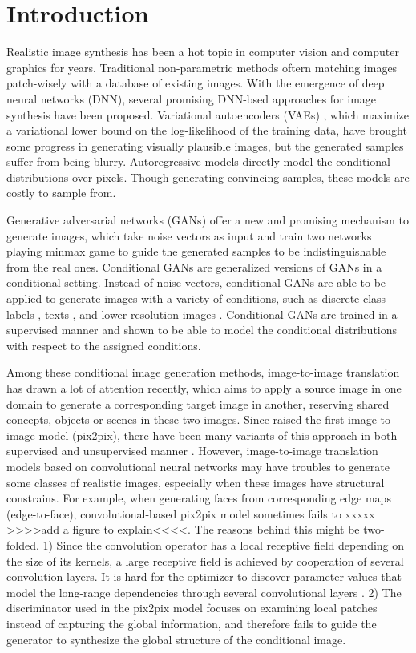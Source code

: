 \section{Introduction}
Realistic image synthesis has been a hot topic in computer vision and computer graphics for years. Traditional non-parametric methods \cite{see DCGAN paper} oftern matching images patch-wisely with a database of existing images. With the emergence of deep neural networks (DNN), several promising DNN-bsed approaches for image synthesis have been proposed. Variational autoencoders (VAEs) \cite{VAEs}, which maximize a variational lower bound on the log-likelihood of the training data, have brought some progress in generating visually plausible images, but the generated samples suffer from being blurry. Autoregressive models \cite{PixCNN} directly model the conditional distributions over pixels. Though generating convincing samples, these models are costly to sample from.
%

Generative adversarial networks (GANs) \cite{GANs} offer a new and promising mechanism to generate images, which take noise vectors as input and train two networks playing minmax game to guide the generated samples to be indistinguishable from the real ones. 
Conditional GANs are generalized versions of GANs in a conditional setting. Instead of noise vectors, conditional GANs are able to be applied to generate images with a variety of conditions, such as discrete class labels \cite{cGANs}, texts \cite{StackGANs, StackGANs++}, and lower-resolution images \cite{SRGANs, more SR}. Conditional GANs are trained in a supervised manner and shown to be able to model the conditional distributions with respect to the assigned conditions.
%

%
Among these conditional image generation methods, image-to-image translation has drawn a lot of attention recently, which aims to apply a source image in one domain to generate a corresponding target image in another, reserving shared concepts, objects or scenes in these two images. Since \cite{pix2pix}  raised the first image-to-image model (pix2pix), there have been many variants of this approach in both supervised and unsupervised manner \cite{CycleGANs, DualGANs,CoupleGANs,BicycleGANs}. However, image-to-image translation models based on convolutional neural networks may have troubles to generate some classes of realistic images, especially when these images have structural constrains. For example, when generating faces from corresponding edge maps (edge-to-face), convolutional-based pix2pix model sometimes fails to xxxxx >>>>add a figure to explain<<<<. The reasons behind this might be two-folded. 1)
Since the convolution operator has a local receptive field depending on the size of its kernels, a large receptive field is achieved by cooperation of several convolution layers. It is hard for the optimizer to discover parameter values that model the long-range dependencies through several convolutional layers \cite{SAGANs}. 2) The discriminator used in the pix2pix model \cite{PatchGANs} focuses on examining local patches instead of capturing the global information, and therefore fails to guide the generator to synthesize the global structure of the conditional image. 

